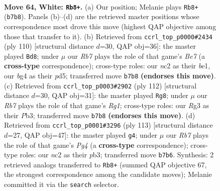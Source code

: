 \documentclass[11pt]{article}
\begin{document}
\clearpage

\begin{figure}[p]\centering
\begin{subfigure}{0.46\textwidth}\centering
\resizebox{\linewidth}{!}{%
\newchessgame
\chessboard[
  setfen={5k2/1R6/7r/8/r5bB/6R1/2n2P2/7K w - - 7 64},
  showmover=false,
  pgfstyle=straightmove, color=movearrow, markmove={b7-b8}
]}
\caption{}
\end{subfigure}\hfill
\begin{subfigure}{0.46\textwidth}\centering
\resizebox{\linewidth}{!}{%
\newchessgame
\chessboard[
  setfen={8/4B1k1/4B1n1/3p4/6R1/3r4/8/4b2K w - - 0 56},
  showmover=false,
  pgfstyle=straightmove, color=movearrow, markmove={e7-d8}
]}
\caption{}
\end{subfigure}
\\[4pt]
\begin{subfigure}{0.46\textwidth}\centering
\resizebox{\linewidth}{!}{%
\newchessgame
\chessboard[
  setfen={8/8/8/1r1BK2k/1b6/1P6/8/6R1 w - - 21 57},
  showmover=false,
  pgfstyle=straightmove, color=movearrow, markmove={g1-g8}
]}
\caption{}
\end{subfigure}\hfill
\begin{subfigure}{0.46\textwidth}\centering
\resizebox{\linewidth}{!}{%
\newchessgame
\chessboard[
  setfen={8/8/5R2/1k3bp1/8/1P2KB1r/8/8 b - - 7 57},
  showmover=false,
  pgfstyle=straightmove, color=movearrow, markmove={g5-g4}
]}
\caption{}
\end{subfigure}
\caption{\textbf{Move 64, White: \texttt{Rb8+}.} (a) Our position; Melanie plays \texttt{Rb8+} (\texttt{b7b8}). Panels (b)--(d) are the retrieved master positions whose correspondence most drove this move (highest QAP objective among those that transfer to it). (b) Retrieved from \texttt{ccrl\_top\_p0000\#2434} (ply 110) [structural distance $d$=30, QAP obj=36]: the master played \texttt{Bd8}; under $\mu$ our \emph{Rb7} plays the role of that game's \emph{Be7} (a \textbf{cross-type} correspondence); cross-type roles: our \emph{n}c2 as their \emph{b}e1, our \emph{b}g4 as their \emph{p}d5; transferred move \texttt{b7b8} \textbf{(endorses this move)}. (c) Retrieved from \texttt{ccrl\_top\_p0003\#2902} (ply 112) [structural distance $d$=30, QAP obj=31]: the master played \texttt{Rg8}; under $\mu$ our \emph{Rb7} plays the role of that game's \emph{Rg1}; cross-type roles: our \emph{R}g3 as their \emph{P}b3; transferred move \texttt{b7b8} \textbf{(endorses this move)}. (d) Retrieved from \texttt{ccrl\_top\_p0001\#3296} (ply 113) [structural distance $d$=27, QAP obj=47]: the master played \texttt{g4}; under $\mu$ our \emph{Rb7} plays the role of that game's \emph{Pg4} (a \textbf{cross-type} correspondence); cross-type roles: our \emph{n}c2 as their \emph{p}b3; transferred move \texttt{b7b6}. Synthesis: 2 retrieved analogs transferred to \texttt{Rb8+} (summed QAP objective 67, the strongest correspondence among the candidate moves); Melanie committed it via the \texttt{search} selector.}
\label{fig:thought-m126}
\end{figure}
\end{document}

